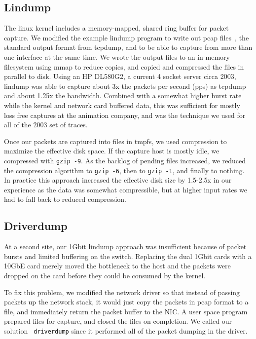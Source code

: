 \subsection{Lindump}

The linux kernel includes a memory-mapped, shared ring buffer for
packet capture.  We modified the example lindump program to write out
pcap files~\cite{pcap}, the standard output format from tcpdump, and
to be able to capture from more than one interface at the same time.
We wrote the output files to an in-memory filesystem using mmap to
reduce copies, and copied and compressed the files in parallel to
disk.  Using an HP DL580G2, a current 4 socket server circa 2003,
lindump was able to capture about 3x the packets per second (pps) as
tcpdump and about 1.25x the bandwidth.  Combined with a somewhat
higher burst rate while the kernel and network card buffered data,
this was sufficient for mostly loss free captures at the animation
company, and was the technique we used for all of the 2003 set of
traces.

Once our packets are captured into files in tmpfs, we used compression
to maximize the effective disk space.  If the capture host is mostly
idle, we compressed with {\tt gzip -9}. As the backlog of pending
files increased, we reduced the compression algorithm to {\tt gzip
-6}, then to {\tt gzip -1}, and finally to nothing.  In practice this
approach increased the effective disk size by 1.5-2.5x in our
experience as the data was somewhat compressible, but at higher input
rates we had to fall back to reduced compression.

\subsection{Driverdump}

At a second site, our 1Gbit lindump approach was insufficient because
of packet bursts and limited buffering on the switch.  Replacing the
dual 1Gbit cards with a 10GbE card merely moved the bottleneck to the
host and the packets were dropped on the card before they could be
consumed by the kernel.

To fix this problem, we modified the network driver so that instead of
passing packets up the network stack, it would just copy the packets
in pcap format to a file, and immediately return the packet
buffer to the NIC.  A user space program prepared files for capture,
and closed the files on completion.  We called our solution {\tt
driverdump} since it performed all of the packet dumping in the
driver.


